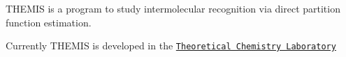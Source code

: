 T\+H\+E\+M\+IS is a program to study intermolecular recognition via direct partition function estimation.~

Currently T\+H\+E\+M\+IS is developed in the \href{http://www.lqt.dq.ufscar.br}{\tt Theoretical Chemistry Laboratory} 